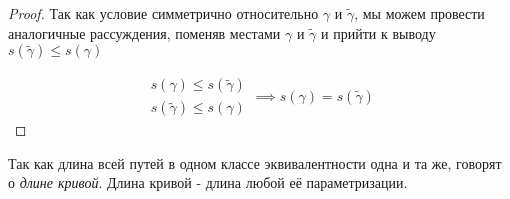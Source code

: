 \documentclass[../main.tex]{subfiles}
\begin{document}
\begin{proof}
    Так как условие симметрично относительно \( \gamma \) и \( \tilde{ \gamma }\), мы можем провести аналогичные рассуждения, поменяв местами \( \gamma \) и \( \tilde{ \gamma }\) и прийти к выводу \( s\left( \tilde\gamma \right) \leq s\left( \gamma \right)\)

    \begin{equation*}
        \begin{aligned}
            s\left( \gamma \right) \leq s\left( \tilde{ \gamma }\right)\\ 
            s\left( \tilde{ \gamma }\right) \leq s\left( \gamma \right)
        \end{aligned}
        \implies 
        s\left( \gamma \right)=s\left( \tilde{ \gamma }\right)
    \end{equation*}
\end{proof}

Так как длина всей путей в одном классе эквивалентности одна и та же, говорят о \emph{длине кривой}. Длина кривой - длина любой её параметризации.
\end{document}
